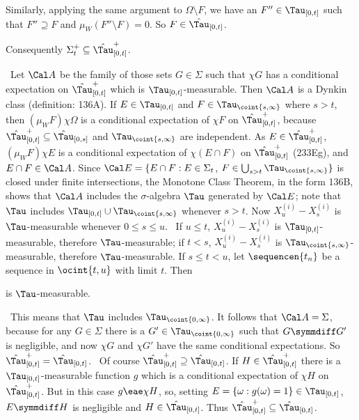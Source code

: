 {Similarly, applying the same argument to $\Omega\setminus F$, we have an
$F''\in\Tau_{[0,t]}$ such that $F''\supseteq F$ and
$\mu_W(F''\setminus F)=0$.   So $F\in\hat\Tau_{[0,t]}$.\ \Qed

Consequently $\Sigma_t^+\subseteq\hat\Tau_{[0,t]}^+$.

\medskip

\grheada\
Let $\Cal A$ be the family of those sets $G\in\Sigma$
such that $\chi G$ has a conditional expectation on
$\hat\Tau_{[0,t]}^+$ which is $\Tau_{[0,t]}$-measurable.
Then $\Cal A$ is a Dynkin class (definition:  136A).
If $E\in\Tau_{[0,t]}$ and $F\in\Tau_{\coint{s,\infty}}$ where $s>t$,
then $(\mu_WF)\chi\Omega$ is a conditional
expectation of $\chi F$ on $\hat\Tau_{[0,t]}^+$, because
$\hat\Tau_{[0,t]}^+\subseteq\hat\Tau_{[0,s]}$ and
$\Tau_{\coint{s,\infty}}$ are independent.   As
$E\in\hat\Tau_{[0,t]}^+$,
$(\mu_WF)\chi E$ is a conditional expectation of $\chi(E\cap F)$ on
$\hat\Tau_{[0,t]}^+$ (233Eg), and $E\cap F\in\Cal A$.   Since
$\Cal E=\{E\cap F:E\in\Sigma_t$,
$F\in\bigcup_{s>t}\Tau_{\coint{s,\infty}}\}$ is closed
under finite intersections, the Monotone Class Theorem, in the form 136B,
shows that $\Cal A$ includes the $\sigma$-algebra $\Tau$ generated by
$\Cal E$;  note that $\Tau$ includes
$\Tau_{[0,t]}\cup\Tau_{\coint{s,\infty}}$ whenever
$s>t$.   Now $X^{(i)}_u-X^{(i)}_s$ is $\Tau$-measurable whenever
$0\le s\le u$.   \Prf\ If $u\le t$, $X^{(i)}_u-X^{(i)}_s$ is
$\Tau_{[0,t]}$-measurable, therefore $\Tau$-measurable;  if $t<s$,
$X^{(i)}_u-X^{(i)}_s$ is
$\Tau_{\coint{s,\infty}}$-measurable, therefore $\Tau$-measurable.
If $s\le t<u$,
let $\sequencen{t_n}$ be a sequence in $\ocint{t,u}$ with
limit $t$.   Then


\noindent is $\Tau$-measurable.\ \Qed

\medskip

\qquad\grheadb\ This means that $\Tau$ includes $\Tau_{\coint{0,\infty}}$.
It follows that $\Cal A=\Sigma$, because for any $G\in\Sigma$ there is a
$G'\in\Tau_{\coint{0,\infty}}$ such that $G\symmdiff G'$ is negligible,
and now $\chi G$ and $\chi G'$ have the same conditional expectations.
So $\hat\Tau_{[0,t]}^+=\hat\Tau_{[0,t]}$.   \Prf\ Of course
$\hat\Tau_{[0,t]}^+\supseteq\hat\Tau_{[0,t]}$.
If $H\in\hat\Tau_{[0,t]}^+$ there is a $\Tau_{[0,t]}$-measurable function
$g$ which is a conditional expectation of
$\chi H$ on $\hat\Tau_{[0,t]}^+$.   But in this case $g\eae\chi H$,
so, setting $E=\{\omega:g(\omega)=1\}\in\Tau_{[0,t]}$, $E\symmdiff H$ is
negligible and $H\in\hat\Tau_{[0,t]}$.   Thus
$\hat\Tau_{[0,t]}^+\subseteq\hat\Tau_{[0,t]}$.\ \Qed

}
